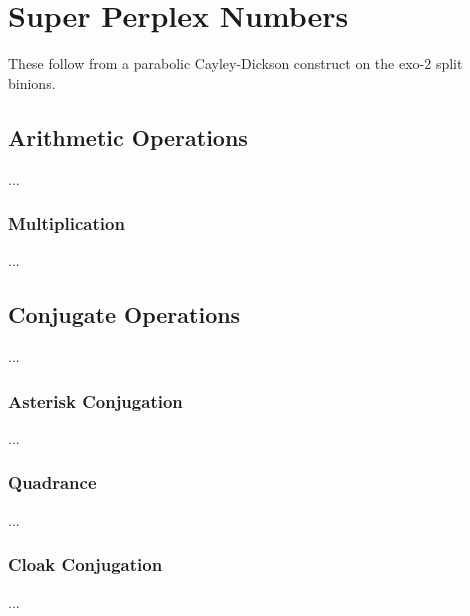 \chapter{Super Perplex Numbers}
These follow from a parabolic Cayley-Dickson construct on the exo-2 split binions.
\section{Arithmetic Operations}
...
\subsection{Multiplication}
...
\section{Conjugate Operations}
...
\subsection{Asterisk Conjugation}
...
\subsection{Quadrance}
...
\subsection{Cloak Conjugation}
...
